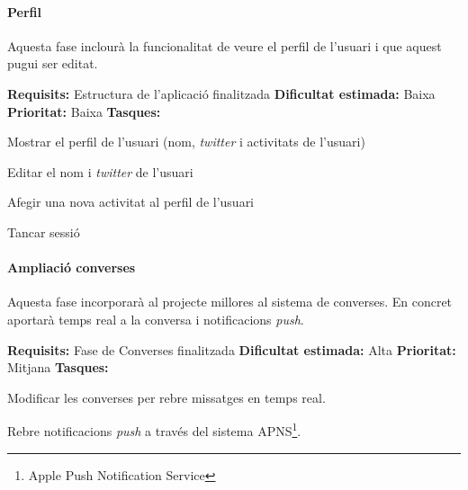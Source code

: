 \paragraph{Perfil\\}
Aquesta fase inclourà la funcionalitat de veure el perfil de l'usuari i que aquest pugui ser editat.

\textbf{Requisits:}  Estructura de l'aplicació finalitzada \newline
\textbf{Dificultat estimada:}  Baixa \newline
\textbf{Prioritat:}  Baixa \newline
\textbf{Tasques:} 
\begin{compactitem}
    \item Mostrar el perfil de l'usuari (nom, \textit{twitter} i activitats de l'usuari)
    \item Editar el nom i \textit{twitter} de l'usuari
    \item Afegir una nova activitat al perfil de l'usuari
    \item Tancar sessió
\end{compactitem}

\paragraph{Ampliació converses\\}
Aquesta fase incorporarà al projecte millores al sistema de converses. En concret aportarà temps real a la conversa i notificacions \textit{push}.

\textbf{Requisits:}  Fase de Converses finalitzada \newline
\textbf{Dificultat estimada:}  Alta \newline
\textbf{Prioritat:}  Mitjana \newline
\textbf{Tasques:} 
\begin{compactitem}
    \item Modificar les converses per rebre missatges en temps real.
    \item Rebre notificacions \textit{push} a través del sistema APNS\footnote{Apple Push Notification Service}.
\end{compactitem}